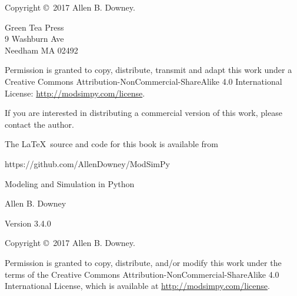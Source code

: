 \documentclass[12pt]{book}
\newcommand{\thetitle}{Modeling and Simulation in Python}
\newcommand{\theauthors}{Allen B. Downey}
\newcommand{\theversion}{3.4.0}
\theoremstyle{exercise}
\begin{document}
\begin{latexonly}
\pagebreak
\thispagestyle{empty}

Copyright \copyright ~2017 \theauthors.



\vspace{0.2in}

\begin{flushleft}
Green Tea Press       \\
9 Washburn Ave \\
Needham MA 02492
\end{flushleft}

Permission is granted to copy, distribute, transmit and adapt this work under a Creative Commons Attribution-NonCommercial-ShareAlike 4.0 International License: \url{http://modsimpy.com/license}.


If you are interested in distributing a commercial version of this
work, please contact the author.

The \LaTeX\ source and code for this book is available from

\begin{code}
https://github.com/AllenDowney/ModSimPy
\end{code}


\cleardoublepage
\setcounter{tocdepth}{1}
\tableofcontents

\end{latexonly}



\begin{htmlonly}

\vspace{1em}

{\Large \thetitle}

{\large \theauthors}

Version \theversion

\vspace{1em}

Copyright \copyright ~2017 \theauthors.

Permission is granted to copy, distribute, and/or modify this work
under the terms of the Creative Commons
Attribution-NonCommercial-ShareAlike 4.0 International License, which is
available at \url{http://modsimpy.com/license}.

\vspace{1em}

\setcounter{chapter}{-1}

\end{htmlonly}
\end{document}

